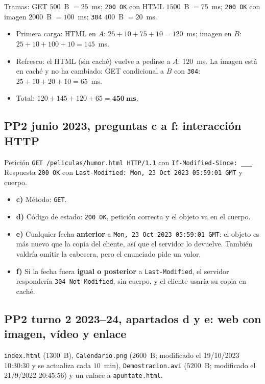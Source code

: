 \documentclass[11pt,a4paper]{article}
\begin{document}
Tramas: GET $500$~B $=25$~ms; \texttt{200 OK} con HTML $1500$~B $=75$~ms; \texttt{200 OK} con imagen $2000$~B $=100$~ms; \texttt{304} $400$~B $=20$~ms.

\begin{itemize}
  \item Primera carga: HTML en $A$: $25+10+75+10=120$~ms; imagen en $B$: $25+10+100+10=145$~ms.
  \item Refresco: el HTML (sin caché) vuelve a pedirse a $A$: $120$~ms. La imagen está en caché y no ha cambiado: GET condicional a $B$ con \texttt{304}: $25+10+20+10=65$~ms.
  \item Total: $120+145+120+65=\mathbf{450~ms}$.
\end{itemize}

\subsection*{PP2 junio 2023, preguntas c a f: interacción HTTP}
Petición \texttt{GET /peliculas/humor.html HTTP/1.1} con \texttt{If-Modified-Since: \_\_\_}. Respuesta \texttt{200 OK} con \texttt{Last-Modified: Mon, 23 Oct 2023 05:59:01 GMT} y cuerpo.

\begin{itemize}
  \item \textbf{c)} Método: \texttt{GET}.
  \item \textbf{d)} Código de estado: \texttt{200 OK}, petición correcta y el objeto va en el cuerpo.
  \item \textbf{e)} Cualquier fecha \textbf{anterior} a \texttt{Mon, 23 Oct 2023 05:59:01 GMT}: el objeto es más nuevo que la copia del cliente, así que el servidor lo devuelve. También valdría omitir la cabecera, pero el enunciado pide un valor.
  \item \textbf{f)} Si la fecha fuera \textbf{igual o posterior} a \texttt{Last-Modified}, el servidor respondería \texttt{304 Not Modified}, sin cuerpo, y el cliente usaría su copia en caché.
\end{itemize}

\subsection*{PP2 turno 2 2023--24, apartados d y e: web con imagen, vídeo y enlace}
\texttt{index.html} ($1300$~B), \texttt{Calendario.png} ($2600$~B; modificado el 19/10/2023 10:30:30 y se actualiza cada $10$~min), \texttt{Demostracion.avi} ($5200$~B; modificado el 21/9/2022 20:45:56) y un enlace a \texttt{apuntate.html}.
\end{document}
